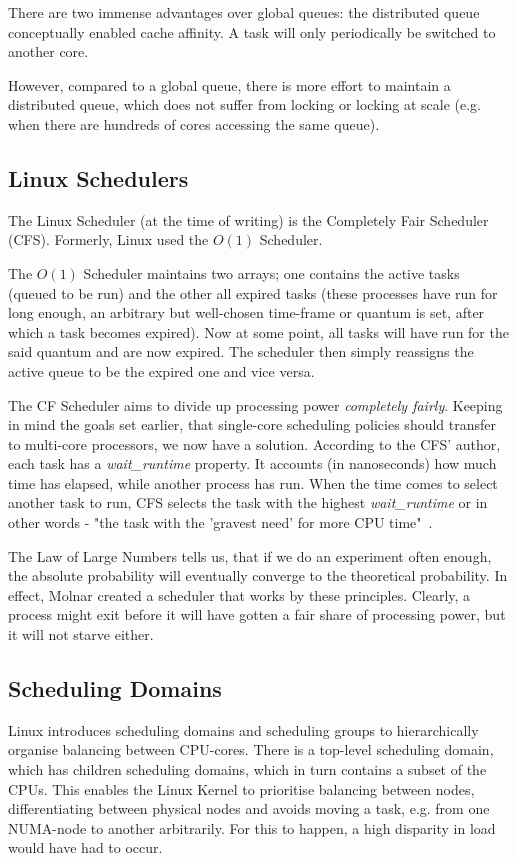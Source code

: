 \documentclass[runningheads]{llncs}
\begin{document}
There are two immense advantages over global queues: the distributed queue conceptually enabled cache affinity. A task will only periodically be switched to another core.

However, compared to a global queue, there is more effort to maintain a distributed queue, which does not suffer from locking or locking at scale (e.g. when there are hundreds of cores accessing the same queue).~\cite{ostep,meehean}

\subsection{Linux Schedulers}
The Linux Scheduler (at the time of writing) is the Completely Fair Scheduler (CFS). Formerly, Linux used the $O(1)$ Scheduler. 

The $O(1)$ Scheduler maintains two arrays; one contains the active tasks (queued to be run) and the other all expired tasks (these processes have run for long enough, an arbitrary but well-chosen time-frame or quantum is set, after which a task becomes expired). Now at some point, all tasks will have run for the said quantum and are now expired. The scheduler then simply reassigns the active queue to be the expired one and vice versa.~\cite{linux-journal-cfs,ostep,meehean}

The CF Scheduler aims to divide up processing power \textit{completely fairly}. Keeping in mind the goals set earlier, that single-core scheduling policies should transfer to multi-core processors, we now have a solution. According to the CFS' author, each task has a \emph{wait\_runtime} property. It accounts (in nanoseconds) how much time has elapsed, while another process has run. When the time comes to select another task to run, CFS selects the task with the highest \emph{wait\_runtime} or in other words - "the task with the 'gravest need' for more CPU time"~\cite{molnar-on-cfs-redhat-forum}.~\cite{molnar-on-cfs-redhat-forum,linux-journal-cfs,ostep,meehean} 

The Law of Large Numbers tells us, that if we do an experiment often enough, the absolute probability will eventually converge to the theoretical probability. In effect, Molnar created a scheduler that works by these principles. Clearly, a process might exit before it will have gotten a fair share of processing power, but it will not starve either.

\subsection{Scheduling Domains}
Linux introduces scheduling domains and scheduling groups to hierarchically organise balancing between CPU-cores. There is a top-level scheduling domain, which has children scheduling domains, which in turn contains a subset of the CPUs.
This enables the Linux Kernel to prioritise balancing between nodes, differentiating between physical nodes and avoids moving a task, e.g. from one NUMA-node to another arbitrarily. For this to happen, a high disparity in load would have had to occur.~\cite{understanding-linux}
\end{document}
